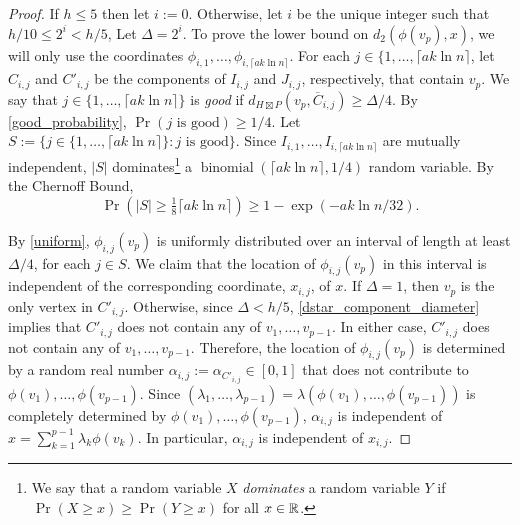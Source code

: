 \documentclass{patmorin}
\renewcommand{\ge}{\geqslant}
\renewcommand{\le}{\leqslant}
\newcommand{\defin}[1]{\emph{\textcolor{brightmaroon}{#1}}}
\begin{document}
\begin{proof}
  If $h \le 5$ then let $i:=0$.  Otherwise, let $i$ be the unique integer such that $h/10\le 2^i < h/5$, Let $\Delta=2^i$.  To prove the lower bound on $d_2(\phi(v_p),x)$, we will only use the coordinates $\phi_{i,1},\ldots,\phi_{i,\lceil a k\ln n\rceil}$.  For each $j\in\{1,\ldots,\lceil ak\ln n\rceil$, let $C_{i,j}$ and $C'_{i,j}$ be the components of $I_{i,j}$ and $J_{i,j}$, respectively, that contain $v_p$. We say that $j\in\{1,\ldots,\lceil a k\ln n\rceil\}$ is \defin{good} if $d_{H\boxtimes P}(v_p,\overline{C}_{i,j})\ge \Delta/4$.  By \cref{good_probability},  $\Pr(\text{$j$ is good})\ge 1/4$. Let $S:=\{j\in\{1,\ldots,\lceil a k\ln n\rceil\}:\text{$j$ is good}\}$.  Since $I_{i,1},\ldots,I_{i,\lceil a k\ln n\rceil}$ are mutually independent, $|S|$ dominates\footnote{We say that a random variable $X$ \defin{dominates} a random variable $Y$ if $\Pr(X\ge x)\ge\Pr(Y\ge x)$ for all $x\in\mathbb{R}$.} a $\operatorname{binomial}(\lceil a k\ln n\rceil,1/4)$ random variable. By the Chernoff Bound,
  $$\Pr(|S|\ge \tfrac{1}{8}\lceil a k\ln n\rceil)\ge 1-\exp(-ak\ln n/32).$$

  By \cref{uniform}, $\phi_{i,j}(v_p)$ is uniformly distributed over an interval of length at least $\Delta/4$, for each $j\in S$.  We claim that the location of $\phi_{i,j}(v_p)$ in this interval is independent of the corresponding coordinate, $x_{i,j}$, of $x$.  If $\Delta=1$, then $v_p$ is the only vertex in $C'_{i,j}$.  Otherwise, since $\Delta<h/5$, \cref{dstar_component_diameter} implies that $C'_{i,j}$ does not contain any of $v_1,\ldots,v_{p-1}$. In either case, $C'_{i,j}$ does not contain any of $v_1,\ldots,v_{p-1}$.  Therefore, the location of $\phi_{i,j}(v_p)$ is determined by a random real number $\alpha_{i,j}:=\alpha_{C'_{i,j}}\in[0,1]$ that does not contribute to $\phi(v_1),\ldots,\phi(v_{p-1})$.  Since $(\lambda_1,\ldots,\lambda_{p-1})=\lambda(\phi(v_1),\ldots,\phi(v_{p-1}))$ is completely determined by $\phi(v_1),\ldots,\phi(v_{p-1})$, $\alpha_{i,j}$ is independent of $x=\sum_{k=1}^{p-1}\lambda_k\phi(v_k)$.  In particular, $\alpha_{i,j}$ is independent of $x_{i,j}$.


\end{proof}
\end{document}
